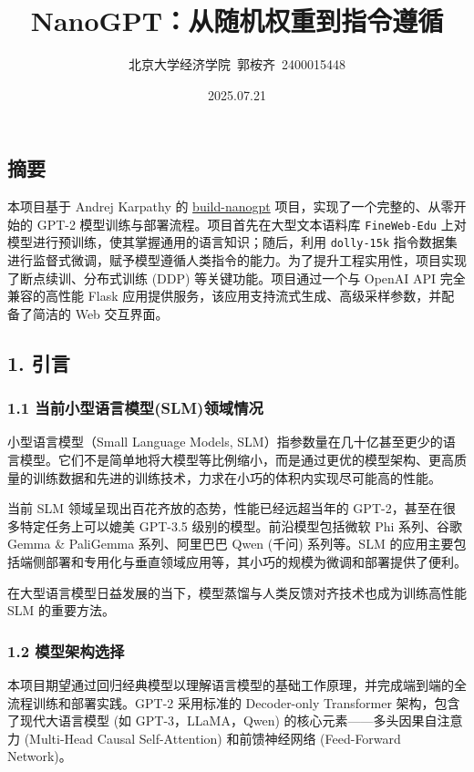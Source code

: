 \documentclass[a4paper]{article}
\title{NanoGPT：从随机权重到指令遵循}
\author{北京大学经济学院\ 郭桉齐\ 2400015448}
\date{2025.07.21}
\begin{document}
\maketitle

\subsection{摘要}\label{ux6458ux8981}

本项目基于 Andrej Karpathy 的
\href{https://github.com/karpathy/build-nanogpt}{build-nanogpt}
项目，实现了一个完整的、从零开始的 GPT-2
模型训练与部署流程。项目首先在大型文本语料库 \texttt{FineWeb-Edu}
上对模型进行预训练，使其掌握通用的语言知识；随后，利用
\texttt{dolly-15k}
指令数据集进行监督式微调，赋予模型遵循人类指令的能力。为了提升工程实用性，项目实现了断点续训、分布式训练
(DDP) 等关键功能。项目通过一个与 OpenAI API 完全兼容的高性能 Flask
应用提供服务，该应用支持流式生成、高级采样参数，并配备了简洁的 Web
交互界面。

\subsection{1. 引言}\label{ux5f15ux8a00}

\subsubsection{1.1
当前小型语言模型(SLM)领域情况}\label{ux5f53ux524dux5c0fux578bux8bedux8a00ux6a21ux578bslmux9886ux57dfux60c5ux51b5}

小型语言模型（Small Language Models,
SLM）指参数量在几十亿甚至更少的语言模型。它们不是简单地将大模型等比例缩小，而是通过更优的模型架构、更高质量的训练数据和先进的训练技术，力求在小巧的体积内实现尽可能高的性能。

当前 SLM 领域呈现出百花齐放的态势，性能已经远超当年的
GPT-2，甚至在很多特定任务上可以媲美 GPT-3.5 级别的模型。前沿模型包括微软
Phi 系列、谷歌 Gemma \& PaliGemma 系列、阿里巴巴 Qwen (千问) 系列等。SLM
的应用主要包括端侧部署和专用化与垂直领域应用等，其小巧的规模为微调和部署提供了便利。

在大型语言模型日益发展的当下，模型蒸馏与人类反馈对齐技术也成为训练高性能
SLM 的重要方法。

\subsubsection{1.2
模型架构选择}\label{ux6a21ux578bux67b6ux6784ux9009ux62e9}

本项目期望通过回归经典模型以理解语言模型的基础工作原理，并完成端到端的全流程训练和部署实践。GPT-2
采用标准的 Decoder-only Transformer 架构，包含了现代大语言模型 (如
GPT-3，LLaMA，Qwen) 的核心元素------多头因果自注意力 (Multi-Head Causal
Self-Attention) 和前馈神经网络 (Feed-Forward Network)。
\end{document}
